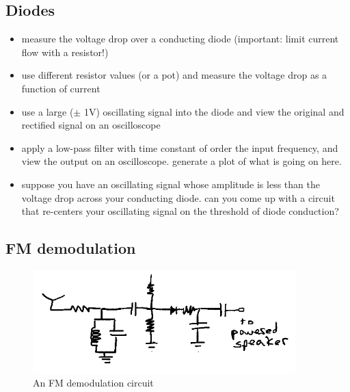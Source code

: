\documentclass[11pt]{article}
\begin{document}
\subsection{Diodes}

\begin{itemize}
\item measure the voltage drop over a conducting diode (important: limit current flow with a resistor!)
\item use different resistor values (or a pot) and measure the voltage drop as a function of current
\item use a large ($\pm$ 1V) oscillating signal into the diode and view the original and rectified 
signal on an oscilloscope
\item apply a low-pass filter with time constant of order the input frequency, and view the 
output on an oscilloscope.  generate a plot of what is going on here.
\item suppose you have an oscillating signal whose amplitude is less than the voltage drop across your conducting
diode.  can you come up with a circuit that re-centers your oscillating signal on the threshold 
of diode conduction?
\end{itemize}

\subsection{FM demodulation}
\begin{figure}[h]
\centering
\includegraphics[width=4in]{plots/fm_demodulation.png}
\caption{An FM demodulation circuit}\label{fig:fm_demodulation}
\end{figure}
\end{document}
